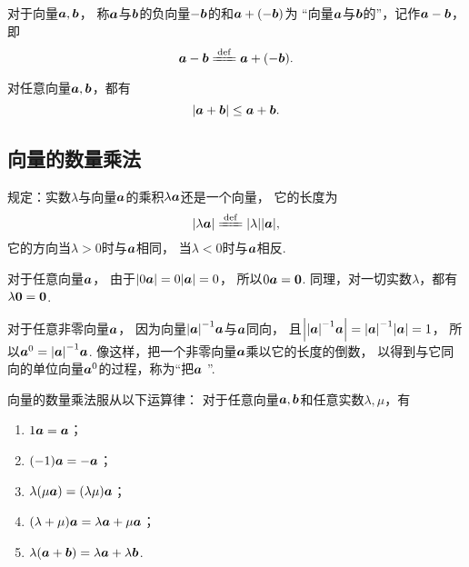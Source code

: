 \begin{definition}
对于向量\(\boldsymbol{a},\boldsymbol{b}\)，
称\(\boldsymbol{a}\)与\(\boldsymbol{b}\)的负向量\(-\boldsymbol{b}\)的和\(\boldsymbol{a}+(-\boldsymbol{b})\)为
“向量\(\boldsymbol{a}\)与\(\boldsymbol{b}\)的”，记作\(\boldsymbol{a}-\boldsymbol{b}\)，即\[
	\mat{a}-\mat{b}
	\defeq
	\mat{a}+(-\mat{b}).
\]
\end{definition}

\begin{theorem}
对任意向量\(\boldsymbol{a},\boldsymbol{b}\)，都有\[
	\abs{\boldsymbol{a}+\boldsymbol{b}} \leq \boldsymbol{a} + \boldsymbol{b}.
\]
\end{theorem}

\subsection{向量的数量乘法}
\begin{definition}
规定：实数\(\lambda\)与向量\(\boldsymbol{a}\)的乘积\(\lambda \boldsymbol{a}\)还是一个向量，
它的长度为\[
\abs{\lambda\mat{a}}
\defeq
\abs{\lambda} \abs{\mat{a}},
\]
它的方向当\(\lambda>0\)时与\(\boldsymbol{a}\)相同，
当\(\lambda<0\)时与\(\boldsymbol{a}\)相反.
\end{definition}

对于任意向量\(\boldsymbol{a}\)，
由于\(\abs{0 \boldsymbol{a}} = 0 \abs{\boldsymbol{a}} = 0\)，
所以\(0 \boldsymbol{a} = \boldsymbol{0}\).
同理，对一切实数\(\lambda\)，都有\(\lambda \boldsymbol{0} = \boldsymbol{0}\).

对于任意非零向量\(\boldsymbol{a}\)，
因为向量\(\abs{\boldsymbol{a}}^{-1} \boldsymbol{a}\)与\(\boldsymbol{a}\)同向，
且\(\abs{\abs{\boldsymbol{a}}^{-1} \boldsymbol{a}}
= \abs{\boldsymbol{a}}^{-1} \abs{\boldsymbol{a}} = 1\)，
所以\(\boldsymbol{a}^0 = \abs{\boldsymbol{a}}^{-1} \boldsymbol{a}\).
像这样，把一个非零向量\(\boldsymbol{a}\)乘以它的长度的倒数，
以得到与它同向的单位向量\(\boldsymbol{a}^0\)的过程，称为“把\(\boldsymbol{a}\) ”.

向量的数量乘法服从以下运算律：
对于任意向量\(\boldsymbol{a},\boldsymbol{b}\)和任意实数\(\lambda,\mu\)，有
\begin{enumerate}
	\item \(1 \boldsymbol{a} = \boldsymbol{a}\)；
	\item \((-1) \boldsymbol{a} = -\boldsymbol{a}\)；
	\item \(\lambda(\mu \boldsymbol{a}) = (\lambda \mu) \boldsymbol{a}\)；
	\item \((\lambda+\mu) \boldsymbol{a} = \lambda \boldsymbol{a} + \mu \boldsymbol{a}\)；
	\item \(\lambda (\boldsymbol{a}+\boldsymbol{b}) = \lambda \boldsymbol{a} + \lambda \boldsymbol{b}\).
\end{enumerate}


